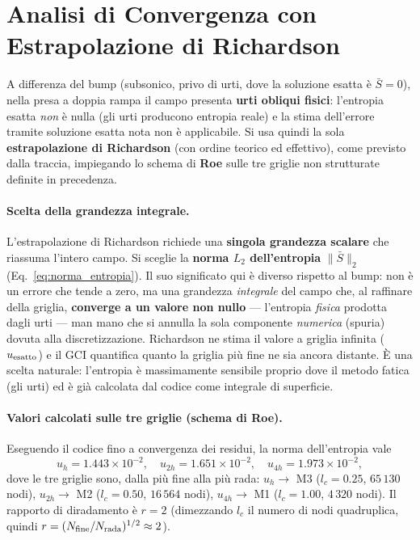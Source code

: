 \section{Analisi di Convergenza con Estrapolazione di Richardson}
\label{sec:presa_convergenza}

A differenza del bump (subsonico, privo di urti, dove la soluzione esatta è $\bar S=0$), nella
presa a doppia rampa il campo presenta \textbf{urti obliqui fisici}: l'entropia esatta \emph{non}
è nulla (gli urti producono entropia reale) e la stima dell'errore tramite soluzione esatta nota
non è applicabile. Si usa quindi la sola \textbf{estrapolazione di Richardson} (con ordine teorico
ed effettivo), come previsto dalla traccia, impiegando lo schema di \textbf{Roe} sulle tre griglie
non strutturate definite in precedenza.

\paragraph{Scelta della grandezza integrale.}
L'estrapolazione di Richardson richiede una \textbf{singola grandezza scalare} che riassuma l'intero
campo. Si sceglie la \textbf{norma $L_2$ dell'entropia} $\|\bar S\|_2$ (Eq.~\ref{eq:norma_entropia}).
Il suo significato qui è diverso rispetto al bump: non è un errore che tende a zero, ma una grandezza
\emph{integrale} del campo che, al raffinare della griglia, \textbf{converge a un valore non nullo}
--- l'entropia \emph{fisica} prodotta dagli urti --- man mano che si annulla la sola componente
\emph{numerica} (spuria) dovuta alla discretizzazione. Richardson ne stima il valore a griglia
infinita ($u_{\rm esatto}$) e il GCI quantifica quanto la griglia più fine ne sia ancora distante.
È una scelta naturale: l'entropia è massimamente sensibile proprio dove il metodo fatica (gli urti)
ed è già calcolata dal codice come integrale di superficie.

\paragraph{Valori calcolati sulle tre griglie (schema di Roe).}
Eseguendo il codice fino a convergenza dei residui, la norma dell'entropia vale
\begin{equation*}
  u_{h} = 1.443\times10^{-2},\quad
  u_{2h} = 1.651\times10^{-2},\quad
  u_{4h} = 1.973\times10^{-2},
\end{equation*}
dove le tre griglie sono, dalla più fine alla più rada:
$u_{h}\!\to$ M3 ($l_c=0.25$, $65\,130$ nodi), $u_{2h}\!\to$ M2 ($l_c=0.50$, $16\,564$ nodi),
$u_{4h}\!\to$ M1 ($l_c=1.00$, $4\,320$ nodi). Il rapporto di diradamento è $r=2$ (dimezzando $l_c$ il
numero di nodi quadruplica, quindi $r=(N_{\rm fine}/N_{\rm rada})^{1/2}\approx2$).

